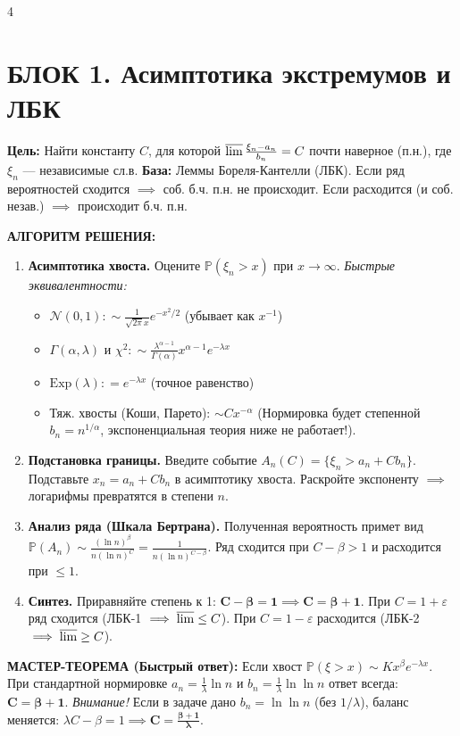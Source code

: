 \documentclass[a4paper, landscape]{article}
\renewcommand{\P}{\mathbb{P}}
\newcommand{\N}{\mathcal{N}}
\begin{document}
\begin{multicols*}{4}

\section*{БЛОК 1. Асимптотика экстремумов и ЛБК}
\textbf{Цель:} Найти константу $C$, для которой $\varlimsup \frac{\xi_n - a_n}{b_n} = C$ почти наверное (п.н.), где $\xi_n$ — независимые сл.в.
\textbf{База:} Леммы Бореля-Кантелли (ЛБК). Если ряд вероятностей сходится $\implies$ соб. б.ч. п.н. не происходит. Если расходится (и соб. незав.) $\implies$ происходит б.ч. п.н.

\textbf{АЛГОРИТМ РЕШЕНИЯ:}
\begin{enumerate}[label=\textbf{Шаг \arabic*.}, leftmargin=*]
    \item \textbf{Асимптотика хвоста.} Оцените $\P(\xi_n > x)$ при $x \to \infty$. 
    \textit{Быстрые эквивалентности:}
    \begin{itemize}
        \item $\N(0,1): \sim \frac{1}{\sqrt{2\pi} x} e^{-x^2/2}$ (убывает как $x^{-1}$)
        \item $\Gamma(\alpha, \lambda) \text{ и } \chi^2: \sim \frac{\lambda^{\alpha-1}}{\Gamma(\alpha)} x^{\alpha-1} e^{-\lambda x}$
        \item $\text{Exp}(\lambda): = e^{-\lambda x}$ (точное равенство)
        \item Тяж. хвосты (Коши, Парето): $\sim C x^{-\alpha}$ (Нормировка будет степенной $b_n=n^{1/\alpha}$, экспоненциальная теория ниже не работает!).
    \end{itemize}
    \item \textbf{Подстановка границы.} Введите событие $A_n(C) = \{\xi_n > a_n + C b_n\}$. Подставьте $x_n = a_n + C b_n$ в асимптотику хвоста. Раскройте экспоненту $\implies$ логарифмы превратятся в степени $n$.
    \item \textbf{Анализ ряда (Шкала Бертрана).} Полученная вероятность примет вид $\P(A_n) \sim \frac{(\ln n)^\beta}{n(\ln n)^C} = \frac{1}{n(\ln n)^{C-\beta}}$. Ряд сходится при $C-\beta > 1$ и расходится при $\le 1$.
    \item \textbf{Синтез.} Приравняйте степень к 1: $\mathbf{C - \beta = 1 \implies C = \beta + 1}$. При $C=1+\varepsilon$ ряд сходится (ЛБК-1 $\implies \varlimsup \le C$). При $C=1-\varepsilon$ расходится (ЛБК-2 $\implies \varlimsup \ge C$). 
\end{enumerate}

\textbf{МАСТЕР-ТЕОРЕМА (Быстрый ответ):}
Если хвост $\P(\xi > x) \sim K x^{\beta} e^{-\lambda x}$. При стандартной нормировке $a_n = \frac{1}{\lambda}\ln n$ и $b_n = \frac{1}{\lambda}\ln \ln n$ ответ всегда: $\mathbf{C = \beta + 1}$.
\textit{Внимание!} Если в задаче дано $b_n = \ln\ln n$ (без $1/\lambda$), баланс меняется: $\lambda C - \beta = 1 \implies \mathbf{C = \frac{\beta + 1}{\lambda}}$.


\end{multicols*}
\end{document}
